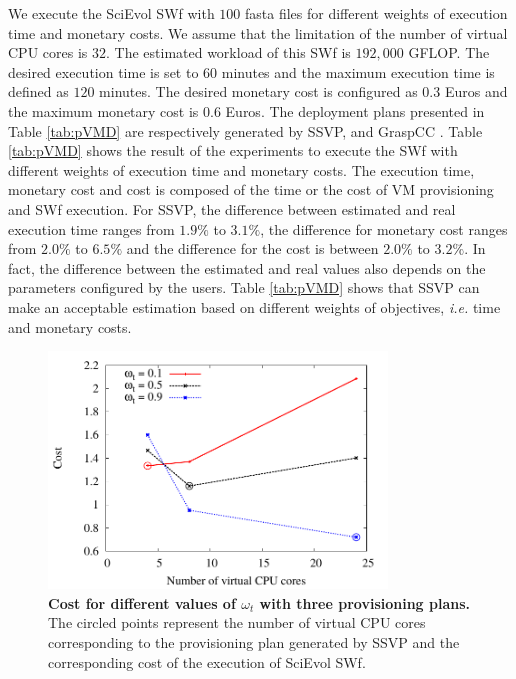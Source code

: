We execute the SciEvol SWf with $100$ fasta files for different weights of execution time and monetary costs. We assume that the limitation of the number of virtual CPU cores is $32$. The estimated workload of this SWf is $192,000$ GFLOP. The desired execution time is set to $60$ minutes and the maximum execution time is defined as $120$ minutes. The desired monetary cost is configured as $0.3$ Euros and the maximum monetary cost is $0.6$ Euros. The deployment plans presented in Table \ref{tab:pVMD} are respectively generated by SSVP, and GraspCC  \cite{Coutinho2014}. Table \ref{tab:pVMD} shows the result of the experiments to execute the SWf with different weights of execution time and monetary costs. The execution time, monetary cost and cost is composed of the time or the cost of VM provisioning and SWf execution. For SSVP, the difference between estimated and real execution time ranges from $1.9\%$ to $3.1\%$, the difference for monetary cost ranges from $2.0\%$ to $6.5\%$ and the difference for the cost is between $2.0\%$ to $3.2\%$. In fact, the difference between the estimated and real values also depends on the parameters configured by the users. Table \ref{tab:pVMD} shows that SSVP can make an acceptable estimation based on different weights of objectives, \textit{i.e.} time and monetary costs.

\begin{figure}[htbp]
\begin{centering}
\captionsetup{justification=centering}
\includegraphics[width=90mm]{figures/FIG6}
\par\end{centering}
\caption{\textbf{Cost for different values of $\omega_t$ with three provisioning plans.} The circled points represent the number of virtual CPU cores corresponding to the provisioning plan generated by SSVP and the corresponding cost of the execution of SciEvol SWf.}
\label{fig:pcost}
\end{figure}


